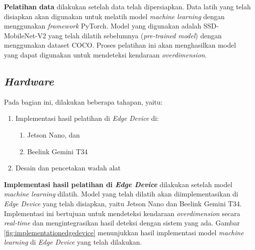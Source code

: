 \textbf{Pelatihan data} dilakukan setelah data telah dipersiapkan. Data latih yang telah disiapkan akan digunakan untuk melatih model \emph{machine learning} dengan menggunakan \emph{framework} PyTorch. Model yang digunakan adalah SSD-MobileNet-V2 yang telah dilatih sebelumnya (\emph{pre-trained model}) dengan menggunakan dataset COCO. Proses pelatihan ini akan menghasilkan model yang dapat digunakan untuk mendeteksi kendaraan \emph{overdimension}.

\subsection{\emph{Hardware}}

Pada bagian ini, dilakukan beberapa tahapan, yaitu:
\begin{enumerate}[nolistsep]
  \item Implementasi hasil pelatihan di \emph{Edge Device} di:
  \begin{enumerate}[nolistsep]
    \item Jetson Nano, dan
    \item Beelink Gemini T34
  \end{enumerate} 
  \item Desain dan pencetakan wadah alat
\end{enumerate}

\textbf{Implementasi hasil pelatihan di \emph{Edge Device}} dilakukan setelah model \emph{machine learning} dilatih. Model yang telah dilatih akan diimplementasikan di \emph{Edge Device} yang telah disiapkan, yaitu Jetson Nano dan Beelink Gemini T34. Implementasi ini bertujuan untuk mendeteksi kendaraan \emph{overdimension} secara \emph{real-time} dan mengintegrasikan hasil deteksi dengan sistem yang ada. Gambar \ref{fig:implementationedgedevice} menunjukkan hasil implementasi model \emph{machine learning} di \emph{Edge Device} yang telah dilakukan.

